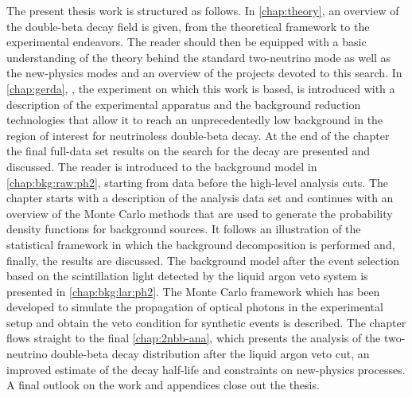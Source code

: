 The present thesis work is structured as follows. In \cref{chap:theory}, an overview of
the double-beta decay field is given, from the theoretical framework to the experimental
endeavors. The reader should then be equipped with a basic understanding of the theory
behind the standard two-neutrino mode as well as the new-physics modes and an overview of
the projects devoted to this search. In \cref{chap:gerda}, \gerda, the experiment on which
this work is based, is introduced with a description of the experimental apparatus and the
background reduction technologies that allow it to reach an unprecedentedly low background
in the region of interest for neutrinoless double-beta decay. At the end of the chapter
the final full-data set results on the search for the decay are presented and discussed.
The reader is introduced to the background model in \cref{chap:bkg:raw:ph2}, starting from
data before the high-level analysis cuts. The chapter starts with a description of the
analysis data set and continues with an overview of the Monte Carlo methods that are used
to generate the probability density functions for background sources. It follows an
illustration of the statistical framework in which the background decomposition is
performed and, finally, the results are discussed. The background model after the event
selection based on the scintillation light detected by the liquid argon veto system is
presented in \cref{chap:bkg:lar:ph2}. The Monte Carlo framework which has been developed
to simulate the propagation of optical photons in the experimental setup and obtain the
veto condition for synthetic events is described. The chapter flows straight to the final
\cref{chap:2nbb-ana}, which presents the analysis of the two-neutrino double-beta decay
distribution after the liquid argon veto cut, an improved estimate of the decay half-life
and constraints on new-physics processes. A final outlook on the work and appendices close
out the thesis.

